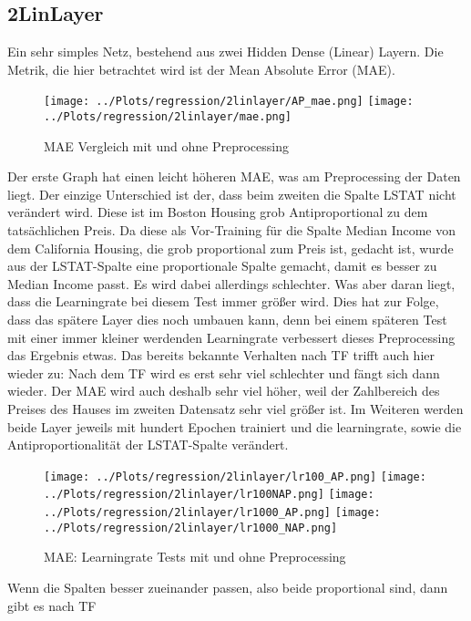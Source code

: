 \subsection{2LinLayer}
    Ein sehr simples Netz, bestehend aus zwei Hidden Dense (Linear) Layern. 
    Die Metrik, die hier betrachtet wird ist der Mean Absolute Error (MAE). 
    \begin{figure}[htpb]
        \texttt{[image: ../Plots/regression/2linlayer/AP\_mae.png]}
        \texttt{[image: ../Plots/regression/2linlayer/mae.png]}
        \caption{\label{fig:figure13} MAE Vergleich mit und ohne Preprocessing}
    \end{figure}
    Der erste Graph hat einen leicht höheren MAE, was am Preprocessing der Daten liegt. 
    Der einzige Unterschied ist der, dass beim zweiten die Spalte LSTAT nicht verändert wird. 
    Diese ist im Boston Housing grob Antiproportional zu dem tatsächlichen Preis. Da diese als 
    Vor-Training für die Spalte Median Income von dem California Housing, die grob proportional 
    zum Preis ist, gedacht ist, wurde aus der LSTAT-Spalte eine proportionale Spalte gemacht, 
    damit es besser zu Median Income passt. Es wird dabei allerdings schlechter. 
    Was aber daran liegt, dass die Learningrate bei diesem Test immer größer wird. Dies hat zur 
    Folge, dass das spätere Layer dies noch umbauen kann, denn bei einem späteren Test mit 
    einer immer kleiner werdenden Learningrate verbessert dieses Preprocessing das 
    Ergebnis etwas. 
    Das bereits bekannte Verhalten nach TF trifft auch hier wieder zu: Nach dem TF wird es 
    erst sehr viel schlechter und fängt sich dann wieder. 
    Der MAE wird auch deshalb sehr viel höher, weil der Zahlbereich des Preises des Hauses im 
    zweiten Datensatz sehr viel größer ist.
    Im Weiteren werden beide Layer jeweils mit hundert Epochen trainiert und die learningrate, 
    sowie die Antiproportionalität der LSTAT-Spalte verändert. 
    \begin{figure}[htpb]
        \texttt{[image: ../Plots/regression/2linlayer/lr100\_AP.png]}
        \texttt{[image: ../Plots/regression/2linlayer/lr100NAP.png]}
        \texttt{[image: ../Plots/regression/2linlayer/lr1000\_AP.png]}
        \texttt{[image: ../Plots/regression/2linlayer/lr1000\_NAP.png]}
        \caption{\label{fig:figure14} MAE: Learningrate Tests mit und ohne Preprocessing}
    \end{figure}
    Wenn die Spalten besser zueinander passen, also beide proportional sind, dann gibt es nach TF 
